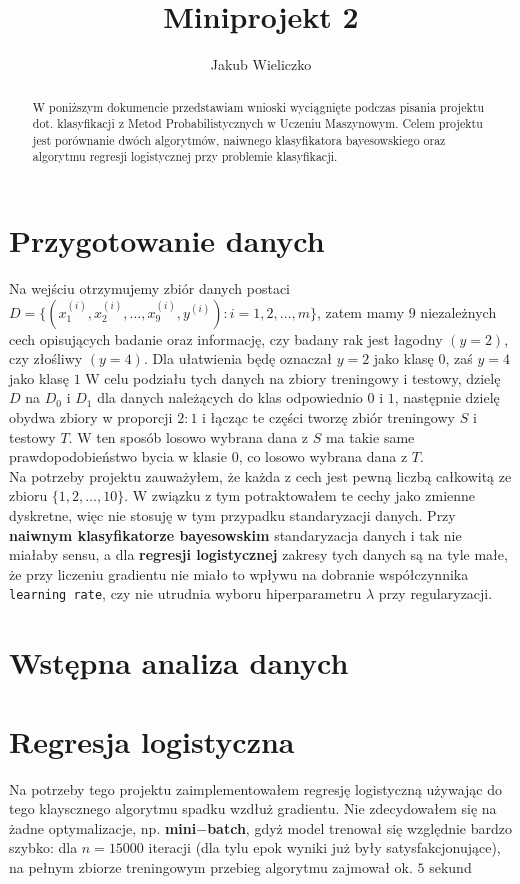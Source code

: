 \documentclass[polish,12pt,a4paper]{extarticle}
\title{Miniprojekt 2}
\author{Jakub Wieliczko}
\begin{document}
\begin{abstract}
    W poniższym dokumencie przedstawiam wnioski wyciągnięte podczas pisania projektu dot. klasyfikacji z Metod Probabilistycznych w Uczeniu Maszynowym. Celem projektu jest porównanie dwóch algorytmów, naiwnego klasyfikatora bayesowskiego oraz algorytmu regresji logistycznej przy problemie klasyfikacji.
\end{abstract}

\section*{Przygotowanie danych}
Na wejściu otrzymujemy zbiór danych postaci $D = \{(x^{(i)}_1, x^{(i)}_2, \dots, x^{(i)}_9, y^{(i)}): i = 1,2,\dots, m\}$, zatem mamy $9$ niezależnych cech opisujących badanie oraz informację, czy badany rak jest łagodny $(y = 2)$, czy złośliwy $(y = 4)$. Dla ułatwienia będę oznaczał $y = 2$ jako klasę $0$, zaś $y = 4$ jako klasę $1$ W celu podziału tych danych na zbiory treningowy i testowy, dzielę $D$ na $D_0$ i $D_1$ dla danych należących do klas odpowiednio $0$ i $1$, następnie dzielę obydwa zbiory w proporcji $2 : 1$ i łącząc te części tworzę zbiór treningowy $S$ i testowy $T$. W ten sposób losowo wybrana dana z $S$ ma takie same prawdopodobieństwo bycia w klasie $0$, co losowo wybrana dana z $T$. \bigskip \\
Na potrzeby projektu zauważyłem, że każda z cech jest pewną liczbą całkowitą ze zbioru $\{1, 2, \dots, 10\}$. W związku z tym potraktowałem te cechy jako zmienne dyskretne, więc nie stosuję w tym przypadku standaryzacji danych. Przy \textbf{naiwnym klasyfikatorze bayesowskim} standaryzacja danych i tak nie miałaby sensu, a dla \textbf{regresji logistycznej} zakresy tych danych są na tyle małe, że przy liczeniu gradientu nie miało to wpływu na dobranie współczynnika \texttt{learning rate}, czy nie utrudnia wyboru hiperparametru $\lambda$ przy regularyzacji.

\section*{Wstępna analiza danych}



\section*{Regresja logistyczna}
Na potrzeby tego projektu zaimplementowałem regresję logistyczną używając do tego klayscznego algorytmu spadku wzdłuż gradientu. Nie zdecydowałem się na żadne optymalizacje, np. \textbf{mini$-$batch}, gdyż model trenował się względnie bardzo szybko: dla $n = 15000$ iteracji (dla tylu epok wyniki już były satysfakcjonujące), na pełnym zbiorze treningowym przebieg algorytmu zajmował ok. $5$ sekund
\end{document}

